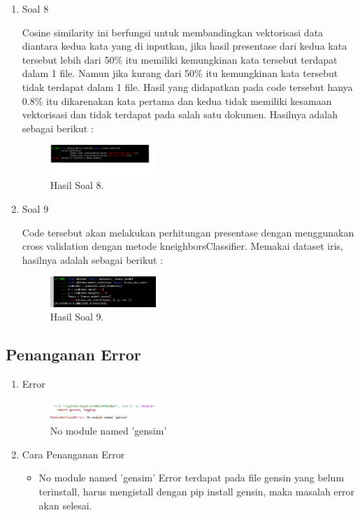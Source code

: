 \begin{enumerate}
	\item Soal 8
	\hfill\break
	
	Cosine similarity ini berfungsi untuk membandingkan vektorisasi data diantara kedua kata yang di inputkan, jika hasil presentase dari kedua kata tersebut lebih dari 50\% itu memiliki kemungkinan kata tersebut terdapat dalam 1 file. Namun jika kurang dari 50\% itu kemungkinan kata tersebut tidak terdapat dalam 1 file. Hasil yang didapatkan pada code tersebut hanya 0.8\% itu dikarenakan kata pertama dan kedua tidak memiliki kesamaan vektorisasi dan tidak terdapat pada salah satu dokumen. Hasilnya adalah sebagai berikut :
	\begin{figure}[H]
	\centering
		\includegraphics[width=4cm]{figures/1174080/5/hasil8_1.PNG}
		\caption{Hasil Soal 8.}
	\end{figure}

	\item Soal 9
	\hfill\break
	
	Code tersebut akan melakukan perhitungan presentase dengan menggunakan cross validation dengan metode kneighborsClassifier. Memakai dataset iris, hasilnya adalah sebagai berikut :
	\begin{figure}[H]
	\centering
		\includegraphics[width=4cm]{figures/1174080/5/hasil9_1.PNG}
		\caption{Hasil Soal 9.}
	\end{figure}
\end{enumerate}

\subsection{Penanganan Error}
\begin{enumerate}
	\item Error 
	\begin{figure}[H]
		\includegraphics[width=4cm]{figures/1174080/5/error.PNG}
		\centering
		\caption{No module named 'gensim'}
	\end{figure}
	\item Cara Penanganan Error
	\begin{itemize}
		\item No module named 'gensim'
		\hfill\break
		Error terdapat pada file gensin yang belum terinstall, harus mengistall dengan pip install gensin, maka masalah error akan selesai.
	\end{itemize}
\end{enumerate}

